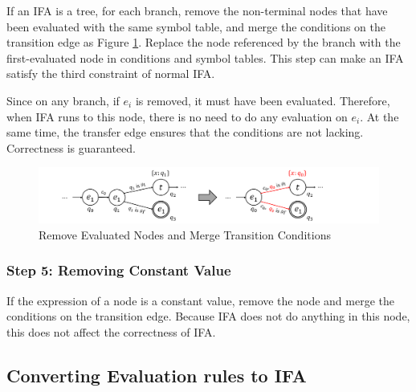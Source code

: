If an IFA is a tree, for each branch, remove the non-terminal nodes that have been evaluated with the same symbol table, and merge the conditions on the transition edge as Figure \ref{fig:nmlifa-merge}. Replace the node referenced by the branch with the first-evaluated node in conditions and symbol tables. This step can make an IFA satisfy the third constraint of normal IFA.

Since on any branch, if $e_i$ is removed, it must have been evaluated. Therefore, when IFA runs to this node, there is no need to do any evaluation on $e_i$. At the same time, the transfer edge ensures that the conditions are not lacking. Correctness is guaranteed.

\begin{figure}[t]
    \centering
    \includegraphics[scale=0.25]{images/nmlifa/nmlifa-merge.png}
    \caption{Remove Evaluated Nodes and Merge Transition Conditions}
    \label{fig:nmlifa-merge}
\end{figure}

\subsubsection*{Step 5: Removing Constant Value}

If the expression of a node is a constant value, remove the node and merge the conditions on the transition edge. Because IFA does not do anything in this node, this does not affect the correctness of IFA.



\subsection{Converting Evaluation rules to IFA}

